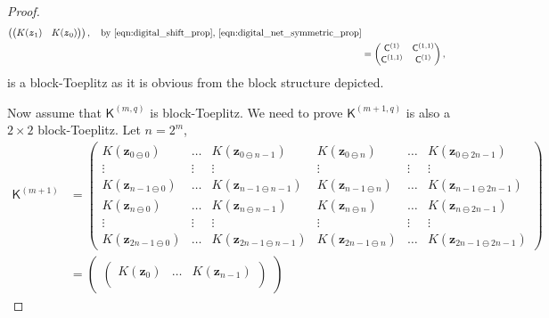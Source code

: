 \documentclass{iitthesis}          %
\newcommand{\bm}[1]{\boldsymbol{#1}}
\newcommand{\naturals}{\mathbb{N}}
\newcommand{\vz}{\bm{z}}
\newcommand{\mC}{\mathsf{C}}
\newcommand{\mK}{\mathsf{K}}
\begin{document}
\begin{proof}
\begin{align*}
\begin{pmatrix}
\begin{pmatrix}
K(\vz_{1}) & K(\vz_{0})
\end{pmatrix} 
\end{pmatrix}, \quad \text{by \eqref{eqn:digital_shift_prop}, \eqref{eqn:digital_net_symmetric_prop}}
\\
& =
\begin{pmatrix}
\mC^{(1)} & \mC^{(1,1)} \\
\mC^{(1,1)} & \mC^{(1)}
\end{pmatrix},
\end{align*}
is a block-Toeplitz as it is obvious from the block structure depicted. 
\fi

Now assume that $\mK^{(m,q)}$ is block-Toeplitz.
We need to prove $\mK^{(m+1, q)}$ is also a $2\times 2$ block-Toeplitz. Let $n=2^m$,
\begin{align*}
\mK^{(m+1)} &= 
\begin{pmatrix}
K(\vz_{0    \ominus 0}) & \hdots & K(\vz_{0    \ominus n-1}) & K(\vz_{0    \ominus n}) & \hdots & K(\vz_{0    \ominus 2n-1}) \\
\vdots             & \vdots &             \vdots          &           \vdots      & \vdots &             \vdots         \\
K(\vz_{n-1  \ominus 0}) & \hdots & K(\vz_{n-1  \ominus n-1}) & K(\vz_{n-1  \ominus n}) & \hdots & K(\vz_{n-1  \ominus 2n-1}) \\
K(\vz_{n    \ominus 0}) & \hdots & K(\vz_{n    \ominus n-1}) & K(\vz_{n    \ominus n}) & \hdots & K(\vz_{n    \ominus 2n-1}) \\
\vdots      & \vdots &             \vdots        &             \vdots      & \vdots &             \vdots         \\
K(\vz_{2n-1 \ominus 0}) & \hdots & K(\vz_{2n-1 \ominus n-1}) & K(\vz_{2n-1 \ominus n}) & \hdots & K(\vz_{2n-1 \ominus 2n-1}) 
\end{pmatrix} 
\\
& = 
\begin{pmatrix}
\begin{pmatrix}
K(\vz_{  0   }) & \hdots & K(\vz_{ n-1}) \\

\end{pmatrix}
\end{pmatrix}
\end{align*}
\end{proof}
\end{document}
